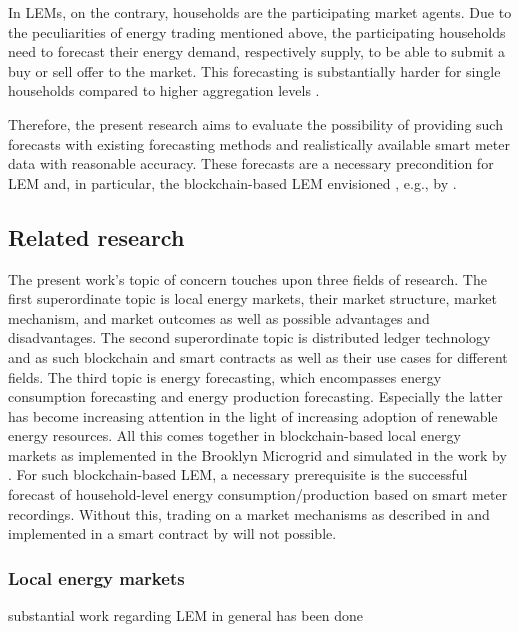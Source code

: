 In LEMs, on the contrary, households are the participating market agents. Due to the peculiarities of energy trading mentioned above, the participating households need to forecast their energy demand, respectively supply, to be able to submit a buy or sell offer to the market. This forecasting is substantially harder for single households compared to higher aggregation levels \citep{Wang:2018}.

Therefore, the present research aims to evaluate the possibility of providing such forecasts with existing forecasting methods and realistically available smart meter data with reasonable accuracy. These forecasts are a necessary precondition for LEM and, in particular, the blockchain-based LEM envisioned , e.g., by \citet{Mengelkamp:2018a}.


\subsection{Related research}\label{Sec:Intro;Subsec:Related}
The present work's topic of concern touches upon three fields of research. The first superordinate topic is local energy markets, their market structure, market mechanism, and market outcomes as well as possible advantages and disadvantages. The second superordinate topic is distributed ledger technology and as such blockchain and smart contracts as well as their use cases for different fields. The third topic is energy forecasting, which encompasses energy consumption forecasting and energy production forecasting. Especially the latter has become increasing attention in the light of increasing adoption of renewable energy resources. All this comes together in blockchain-based local energy markets as implemented in the Brooklyn Microgrid and simulated in the work by \citet{Mengelkamp:2018a}. For such blockchain-based LEM, a necessary prerequisite  is the successful forecast of household-level energy consumption/production based on smart meter recordings. Without this, trading on a market mechanisms as described in \citet{Block:2008} and implemented in a smart contract by \citet{Mengelkamp:2018a} will not possible.


\subsubsection{Local energy markets}
substantial work regarding LEM in general has been done \citep[e.g.,][]{Lamparter:2010, Li:2015, Mihaylov:2014}



